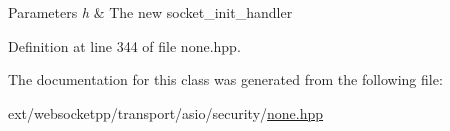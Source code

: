 \begin{DoxyParams}{Parameters}
{\em h} & The new socket\+\_\+init\+\_\+handler \\
\hline
\end{DoxyParams}


Definition at line 344 of file none.\+hpp.



The documentation for this class was generated from the following file\+:\begin{DoxyCompactItemize}
\item 
ext/websocketpp/transport/asio/security/\hyperlink{transport_2asio_2security_2none_8hpp}{none.\+hpp}\end{DoxyCompactItemize}
